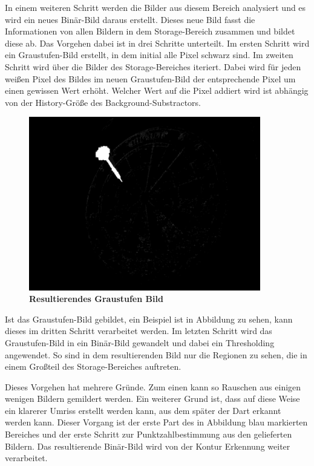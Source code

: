 In einem weiteren Schritt werden die Bilder aus diesem Bereich analysiert und es wird ein neues Binär-Bild daraus erstellt. Dieses neue Bild fasst die Informationen von allen Bildern in dem Storage-Bereich zusammen und bildet diese ab.
Das Vorgehen dabei ist in drei Schritte unterteilt.
Im ersten Schritt wird ein Graustufen-Bild erstellt, in dem initial alle Pixel schwarz sind. 
Im zweiten Schritt wird über die Bilder des Storage-Bereiches iteriert. Dabei wird für jeden weißen Pixel des Bildes im neuen Graustufen-Bild der entsprechende Pixel um einen gewissen Wert erhöht. Welcher Wert auf die Pixel addiert wird ist abhängig von der History-Größe des Background-Substractors.
\begin{figure}[ht]
\centering
\includegraphics[width=0.9\textwidth]{media/blobimg}
\caption{\textbf{Resultierendes Graustufen Bild}}
\label{Fig:greyimg}
\end{figure}
Ist das Graustufen-Bild gebildet, ein Beispiel ist in Abbildung  zu sehen, kann dieses im dritten Schritt verarbeitet werden. 
Im letzten Schritt wird das Graustufen-Bild in ein Binär-Bild gewandelt und dabei ein Thresholding angewendet. So sind in dem resultierenden Bild nur die Regionen zu sehen, die in einem Großteil des Storage-Bereiches auftreten. 

Dieses Vorgehen hat mehrere Gründe. 
Zum einen kann so Rauschen aus einigen wenigen Bildern gemildert werden. 
Ein weiterer Grund ist, dass auf diese Weise ein klarerer Umriss erstellt werden kann, aus dem später der Dart erkannt werden kann. 
Dieser Vorgang ist der erste Part des in Abbildung  blau markierten Bereiches und der erste Schritt zur Punktzahlbestimmung aus den gelieferten Bildern. Das resultierende Binär-Bild wird von der Kontur Erkennung weiter verarbeitet.

